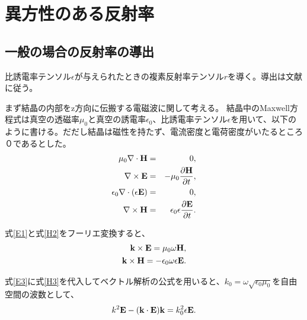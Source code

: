 \documentclass[11pt,a4paper]{jsarticle}
\begin{document}
\section{異方性のある反射率}
\subsection{一般の場合の反射率の導出}
比誘電率テンソル$\epsilon$が与えられたときの複素反射率テンソル$r$を導く。導出は文献\cite{dielectric_tensor_triclinic}に従う。

まず結晶の内部をz方向に伝搬する電磁波に関して考える。
結晶中のMaxwell方程式は真空の透磁率$\mu_0$と真空の誘電率$\epsilon_0$、比誘電率テンソル$\epsilon$を用いて、以下のように書ける。だだし結晶は磁性を持たず、電流密度と電荷密度がいたるところ０であるとした。
\begin{eqnarray}
\label{H1}
\mu_0 \nabla \cdot {\bf H} &=& 0,\\
\label{E1}
\nabla \times {\bf E} &=& -\mu_0 \frac{\partial \bf H}{\partial t},\\
\label{E2}
\epsilon_0 \nabla \cdot  (\epsilon {\bf E}) &=& 0,\\
\label{H2}
\nabla \times {\bf H} &=& \epsilon_0 \epsilon  \frac{\partial \bf E}{ \partial t}.
\end{eqnarray}

式\ref{E1}と式\ref{H2}をフーリエ変換すると、
\begin{eqnarray}
\label{E3}
{\bf k} \times {\bf E} = \mu_0 \omega {\bf H},\\
\label{H3}
{\bf k} \times {\bf H} = -\epsilon_0 \omega  \epsilon  {\bf E}.
\end{eqnarray}

式\ref{E3}に式\ref{H3}を代入してベクトル解析の公式を用いると、$k_0=\omega \sqrt{\epsilon_0 \mu_0}$を自由空間の波数として、
\begin{eqnarray}
\label{kk}
k^2 {\bf E} - ( {\bf k} \cdot {\bf E} ) {\bf k}=  k_0^2  \epsilon {\bf E}.
\end{eqnarray}
\end{document}
